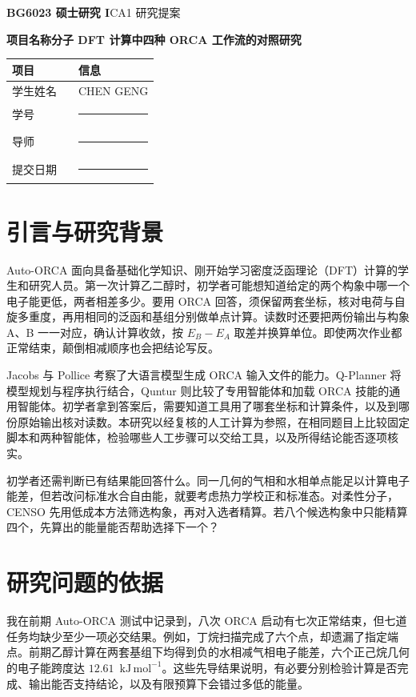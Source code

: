 \documentclass[12pt,a4paper]{article}
\newcommand{\kJmol}{\ensuremath{\mathrm{kJ\,mol^{-1}}}}
\newcommand{\blankfield}{\rule{3.5cm}{0.35pt}}
\newcommand{\StudentName}{CHEN GENG}
\newcommand{\StudentID}{\blankfield}
\newcommand{\Supervisor}{\blankfield}
\newcommand{\SubmissionDate}{\blankfield} %
\begin{document}
\textbf{BG6023 硕士研究 I}\hfill CA1 研究提案\par
\textbf{项目名称\quad 分子 DFT 计算中四种 ORCA 工作流的对照研究}\par
\begin{tabularx}{\linewidth}{|P{0.456\linewidth}|Y|}
\hline
{}\textbf{项目} & \textbf{信息} \\ \hline
学生姓名 & \StudentName \\ \hline
学号 & \StudentID \\ \hline
导师 & \Supervisor \\ \hline
提交日期 & \SubmissionDate \\ \hline
\end{tabularx}

\section{引言与研究背景}
Auto-ORCA 面向具备基础化学知识、刚开始学习密度泛函理论（DFT）计算的学生和研究人员。第一次计算乙二醇时，初学者可能想知道给定的两个构象中哪一个电子能更低，两者相差多少。要用 ORCA 回答，须保留两套坐标，核对电荷与自旋多重度，再用相同的泛函和基组分别做单点计算。读数时还要把两份输出与构象 A、B 一一对应，确认计算收敛，按 $E_B-E_A$ 取差并换算单位。即使两次作业都正常结束，颠倒相减顺序也会把结论写反。

Jacobs 与 Pollice 考察了大语言模型生成 ORCA 输入文件的能力\cite{jacobs}。Q-Planner 将模型规划与程序执行结合\cite{qplanner}，Quntur 则比较了专用智能体和加载 ORCA 技能的通用智能体\cite{quntur}。初学者拿到答案后，需要知道工具用了哪套坐标和计算条件，以及到哪份原始输出核对读数。本研究以经复核的人工计算为参照，在相同题目上比较固定脚本和两种智能体，检验哪些人工步骤可以交给工具，以及所得结论能否逐项核实。

初学者还需判断已有结果能回答什么。同一几何的气相和水相单点能足以计算电子能差，但若改问标准水合自由能，就要考虑热力学校正和标准态。对柔性分子，CENSO 先用低成本方法筛选构象，再对入选者精算\cite{censo}。若八个候选构象中只能精算四个，先算出的能量能否帮助选择下一个？

\section{研究问题的依据}
我在前期 Auto-ORCA 测试中记录到，八次 ORCA 启动有七次正常结束，但七道任务均缺少至少一项必交结果。例如，丁烷扫描完成了六个点，却遗漏了指定端点。前期乙醇计算在两套基组下均得到负的水相减气相电子能差，六个正己烷几何的电子能跨度达 $12.61$~\kJmol{}。这些先导结果说明，有必要分别检验计算是否完成、输出能否支持结论，以及有限预算下会错过多低的能量。
\end{document}
